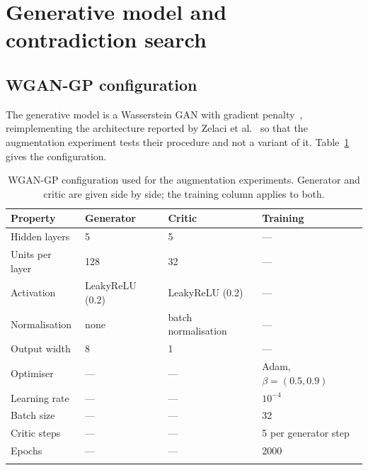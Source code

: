 \documentclass[pdflatex,sn-basic,Numbered]{sn-jnl}
\begin{document}
\section{Generative model and contradiction search}\label{sup:gan}

\subsection{WGAN-GP configuration}

The generative model is a Wasserstein GAN with gradient
penalty~\cite{gulrajani2017}, reimplementing the architecture reported by Zelaci
et al.~\cite{zelaci2021} so that the augmentation experiment tests their
procedure and not a variant of it. Table~\ref{tab:wgan} gives the configuration.

\begin{table}[h]
\caption{WGAN-GP configuration used for the augmentation experiments.
Generator and critic are given side by side; the training column applies to
both.}\label{tab:wgan}
\begin{tabular*}{\textwidth}{@{\extracolsep\fill}llll}
\toprule
Property & Generator & Critic & Training \\
\midrule
Hidden layers    & 5                & 5                    & --- \\
Units per layer  & 128              & 32                   & --- \\
Activation       & LeakyReLU (0.2)  & LeakyReLU (0.2)      & --- \\
Normalisation    & none             & batch normalisation  & --- \\
Output width     & 8                & 1                    & --- \\
\midrule
Optimiser        & ---              & ---                  & Adam, $\beta = (0.5, 0.9)$ \\
Learning rate    & ---              & ---                  & $10^{-4}$ \\
Batch size       & ---              & ---                  & 32 \\
Critic steps     & ---              & ---                  & 5 per generator step \\
Epochs           & ---              & ---                  & 2000 \\
\botrule
\end{tabular*}
\end{table}
\end{document}
